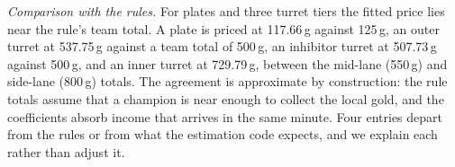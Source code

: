 \emph{Comparison with the rules.} For plates and three turret tiers the fitted price lies near the
rule's team total. A plate is priced at 117.66\,g against 125\,g, an outer turret at 537.75\,g against a team total of
500\,g, an inhibitor turret at 507.73\,g against 500\,g, and an inner turret at 729.79\,g, between the
mid-lane (550\,g) and side-lane (800\,g) totals. The agreement is approximate by construction: the
rule totals assume that a champion is near enough to collect the local gold, and the coefficients
absorb income that arrives in the same minute. Four entries depart from the rules or from what the
estimation code expects, and we explain each rather than adjust it.
